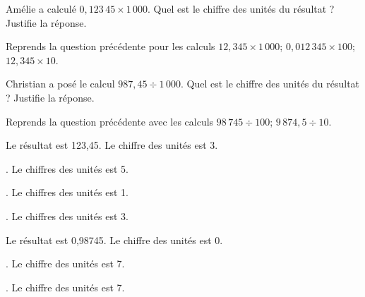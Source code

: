 \begin{myenumerate}
\item Amélie a calculé $0,123\,45\times1\,000$. Quel est le
chiffre des unités du résultat ? Justifie la réponse.
\item Reprends la question précédente pour les calculs
$12,345\times1\,000$; $0,012\,345\times100$; $12,345\times10$.
\item Christian a posé le calcul $987,45\div1\,000$. Quel
est le chiffre des unités du résultat ? Justifie la réponse.
\item Reprends la question précédente avec les calculs $98\,745\div100$;
$9\,874,5\div10$.
\end{myenumerate}
\begin{myenumerate}
  \item Le résultat est 123,45. Le chiffre des unités est 3.
  \item {}. Le chiffres des unités est 5.
\par{}. Le chiffres des unités est 1.
\par{}. Le chiffres des unités est 3.
\item Le résultat est 0,98745. Le chiffre des unités est 0.
\item {}. Le chiffre des unités est 7.
\par{}. Le chiffre des unités est 7.
\end{myenumerate}
